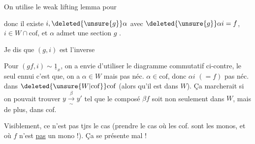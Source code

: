 
On utilise le weak lifting lemma pour



donc il existe $i,\deleted{\unsure{g}}\alpha$ avec $\deleted{\unsure{g}}\alpha i=f$,  $i\in W\cap\mathrm{cof}$, et $\alpha$ admet une section $g$ .

Je dis que $(g,i)$ est l'inverse   


Pour $(gf,i)\sim\underline{1}_x$, on a envie d'utiliser le diagramme commutatif ci-contre, le seul ennui c'est que, on a $\alpha\in W$ mais pas néc. $\alpha\in\mathrm{cof}$, donc $\alpha i$ $(=f)$ pas néc. dans $\deleted{\unsure{W|\mathrm{cof}}}\mathrm{cof}$ (alors qu'il est dans $W$). Ça marcherait si on pouvait trouver $y\xrightarrow[\sim]{\beta}y'$  tel que le composé $\beta f$ soit non seulement dans $W$, mais de plus, dans cof.

Visiblement, ce n'est pas tjrs le cas (prendre le cas où les cof. sont les monos, et où $f$ n'est \uline{pas} un mono !). Ça se présente mal !


